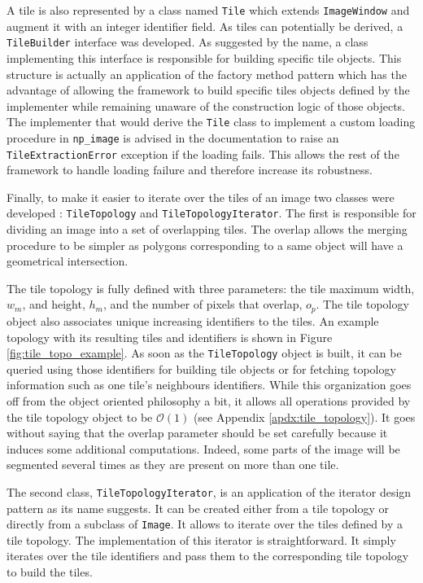 A tile is also represented by a class named \texttt{Tile} which extends \texttt{ImageWindow} and augment it with an integer identifier field. As tiles can potentially be derived, a \texttt{TileBuilder} interface was developed. As suggested by the name, a class implementing this interface is responsible for building specific tile objects. This structure is actually an application of the factory method pattern which has the advantage of allowing the framework to build specific tiles objects defined by the implementer while remaining unaware of the construction logic of those objects. The implementer that would derive the \texttt{Tile} class to implement a custom loading procedure in \texttt{np\_image} is advised in the documentation to raise an \texttt{TileExtractionError} exception if the loading fails. This allows the rest of the framework to handle loading failure and therefore increase its robustness. 

Finally, to make it easier to iterate over the tiles of an image two classes were developed : \texttt{TileTopology} and \texttt{TileTopologyIterator}. The first is responsible for dividing an image into a set of overlapping tiles. The overlap allows the merging procedure to be simpler as polygons corresponding to a same object will have a geometrical intersection. 

The tile topology is fully defined with three parameters: the tile maximum width, $w_m$, and height, $h_m$, and the number of pixels that overlap, $o_p$. The tile topology object also associates unique increasing identifiers to the tiles. An example topology with its resulting tiles and identifiers is shown in Figure \ref{fig:tile_topo_example}. As soon as the \texttt{TileTopology} object is built, it can be queried using those identifiers for building tile objects or for fetching topology information such as one tile's neighbours identifiers. While this organization goes off from the object oriented philosophy a bit, it allows all operations provided by the tile topology object to be $\mathcal{O}(1)$ (see Appendix \ref{apdx:tile_topology}). It goes without saying that the overlap parameter should be set carefully because it induces some additional computations. Indeed, some parts of the image will be segmented several times as they are present on more than one tile. 

The second class, \texttt{TileTopologyIterator}, is an application of the iterator design pattern as its name suggests. It can be created either from a tile topology or directly from a subclass of \texttt{Image}. It allows to iterate over the tiles defined by a tile topology. The implementation of this iterator is straightforward. It simply iterates over the tile identifiers and pass them to the corresponding tile topology to build the tiles. 

